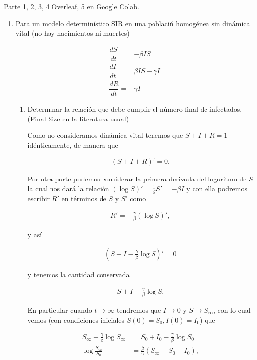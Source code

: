 \documentclass[answers]{exam}
\begin{document}
\begin{questions}

\question Parte 1, 2, 3, 4 Overleaf, 5 en Google Colab.
\begin{enumerate}
\item Para un modelo determin\'istico SIR en una poblaci\'n homog\'enea sin din\'amica vital (no hay nacimientos ni muertes)

\begin{align}
     \dfrac{dS}{dt}=&-\beta IS  \label{susceptible}\\
     \dfrac{dI}{dt}=&\beta IS -\gamma I \label{Infected}\\
     \dfrac{dR}{dt}=&\gamma I \label{Recuperated}
\end{align}

\begin{enumerate}
\item  Determinar la relaci\'on que debe cumplir el n\'umero final de infectados. (Final Size en la literatura usual)

\begin{solution}
Como no consideramos dinámica vital tenemos que $S + I + R = 1$ idénticamente, de manera que

\begin{align*}
    (S + I + R)' = 0.
\end{align*}

Por otra parte podemos considerar la primera derivada del logaritmo de $S$ la cual nos dará la relación $(\log{S})' = \frac{1}{S}S' = -\beta I$ y con ella podremos escribir $R'$ en términos de $S$ y $S'$ como

\begin{align*}
    R' = -\frac{\gamma}{\beta}(\log{S})',
\end{align*}

y así

\begin{align*}
    \left(S + I - \frac{\gamma}{\beta}\log{S}\right)' = 0
\end{align*}

y tenemos la cantidad conservada

\begin{align*}
    S + I - \frac{\gamma}{\beta}\log{S}.
\end{align*}

En particular cuando $t \to \infty$ tendremos que $I \to 0$ y $S \to S_\infty$, con lo cual vemos (con condiciones iniciales $S(0) = S_0, I(0) = I_0$) que

\begin{align*}
    S_\infty - \frac{\gamma}{\beta}\log{S_\infty} &= S_0 + I_0 - \frac{\gamma}{\beta}\log{S_0}\\
    \log{\frac{S_\infty}{S_0}} &= \frac{\beta}{\gamma}(S_\infty - S_0 - I_0),
\end{align*}


\end{solution}
\end{enumerate}
\end{enumerate}
\end{questions}
\end{document}
